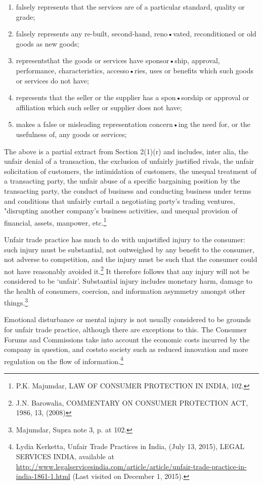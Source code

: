 \begin{multicols}{2}
{\begin{enumerate}[label=(\roman*)]
\item falsely represents that the services are of a particular standard, quality or grade;

\item falsely represents any re-built, second-hand, reno•vated, reconditioned or old goods as new goods;

\item representsthat the goods or services have sponsor•ship, approval, performance, characteristics,
accesso•ries, uses or benefits which such goods or services do not have;

\item represents that the seller or the supplier has a spon•sorship or approval or affiliation which such seller or
supplier does not have;

\item makes a false or misleading representation concern•ing the need for, or the usefulness of, any goods or services;
\end{enumerate}}

\noi
The above is a partial extract from Section 2(1)(r) and includes, inter alia, the unfair denial of
a transaction, the exclusion of unfairly justified rivals, the unfair solicitation of customers, the
intimidation of customers, the unequal treatment of a transacting party, the unfair abuse of a
specific bargaining position by the transacting party, the conduct of business and conducting
business under terms and conditions that unfairly curtail a negotiating party's trading ventures, "disrupting another company's business activities, and unequal provision of financial, assets,
manpower, etc.\footnote{P.K. Majumdar, LAW OF CONSUMER PROTECTION IN INDIA, 102.}

\noi
Unfair trade practice has much to do with unjustified injury to the consumer: such injury must
be substantial, not outweighed by any benefit to the consumer, not adverse to competition, and
the injury must be such that the consumer could not have reasonably avoided it.\footnote{J.N. Barowalia, COMMENTARY ON CONSUMER PROTECTION ACT, 1986, 13, (2008)} It therefore follows that any injury will not be considered to be ‘unfair’. Substantial injury includes monetary harm, damage to the health of consumers, coercion, and information asymmetry amongst other things.\footnote{Majumdar, Supra note 3, p. at 102.}

\noi
Emotional disturbance or mental injury is not usually considered to be grounds for unfair trade
practice, although there are exceptions to this. The Consumer Forums and Commissions take
into account the economic costs incurred by the company in question, and coststo society such
as reduced innovation and more regulation on the flow of information.\footnote{Lydia Kerketta, Unfair Trade Practices in India, (July 13, 2015), LEGAL SERVICES INDIA, available at  \url{http://www.legalservicesindia.com/article/article/unfair-trade-practice-in-india-1861-1.html} (Last visited on
December 1, 2015).}


\end{multicols}
